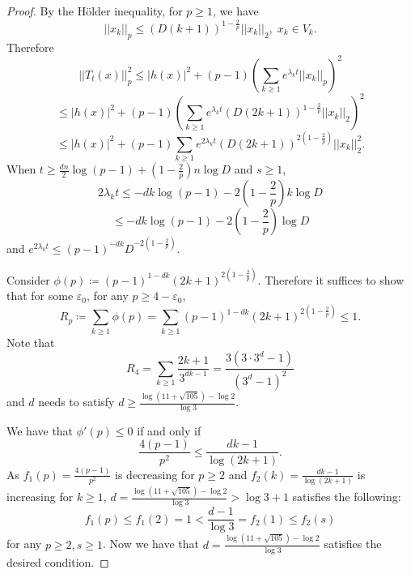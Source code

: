 \documentclass[10pt,a4paper]{amsart}
\begin{document}
 \begin{proof}
 By the H\"older inequality, for $p\geq1$, we have
 \[||x_k||_p\leq(D(k+1))^{1-\frac{2}{p}}||x_k||_2, \;x_k\in V_k.\]
 Therefore
 \[||T_t(x)||_p^2\leq |h(x)|^2+(p-1)\left(\sum_{k\geq1} e^{\lambda_k t}||x_k||_p\right)^2\]
 \[\leq |h(x)|^2+(p-1)\left(\sum_{k\geq1} e^{\lambda_k t}(D(2k+1))^{1-\frac{2}{p}}||x_k||_2\right)^2\]
 \[\leq  |h(x)|^2+(p-1) \sum_{k\geq1} e^{2 \lambda_k t}(D(2k+1))^{2(1-\frac{2}{p})}||x_k||_2^2.\]
 When $t\geq \frac{dn}{2}\log{(p-1)}+(1-\frac{2}{p})n\log{D}$ and $s\geq1$, 
 \[2\lambda_kt\leq-dk\log{(p-1)}-2\left(1-\frac{2}{p}\right)k\log{D}\]
 \[\leq -dk\log{(p-1)}-2\left(1-\frac{2}{p}\right)\log{D}\]
 and $e^{2\lambda_kt}\leq (p-1)^{-dk}D^{-2(1-\frac{2}{p})}.$
 
Consider $\phi(p)\coloneqq (p-1)^{1-dk}(2k+1)^{2(1-\frac{2}{p})}$.
 Therefore it suffices to show that for some $\varepsilon_0$, for any $p\geq 4-\varepsilon_0$,
 \[R_p\coloneqq\sum_{k\geq1}\phi(p)=\sum_{k\geq1}(p-1)^{1-dk}(2k+1)^{2(1-\frac{2}{p})}\leq 1.\]
Note that 
 \[R_4=\sum_{k\geq1}\frac{2k+1}{3^{dk-1}}=\frac{3(3\cdot3^d-1)}{(3^d-1)^2}\]
 and $d$ needs to satisfy $d\geq \frac{\log(11+\sqrt{105})-\log2}{\log3}$.
 
We have that $\phi'(p)\leq0$ if and only if
\[\frac{4(p-1)}{p^2}\leq\frac{dk-1}{\log{(2k+1)}}.\]
As $f_1(p)=\frac{4(p-1)}{p^2}$ 
is decreasing for $p\geq2$ and $f_2(k)=\frac{dk-1}{\log{(2k+1)}}$
 is increasing for 
 $k\geq1$, $d=\frac{\log(11+\sqrt{105})-\log2}{\log3}>\log{3}+1$ satisfies the following:
\[f_1(p)\leq f_1(2)=1<\frac{d-1}{\log{3}}=f_2(1)\leq f_2(s)\]
for any $p\geq2, s\geq1$.
Now we have that $d =\frac{\log(11+\sqrt{105})-\log2}{\log3}$ satisfies the desired condition.
 \end{proof}
\end{document}
